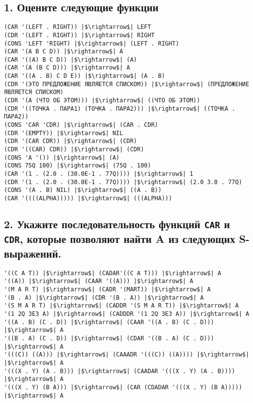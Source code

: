 \documentclass{amsart}
\begin{document}
\subsection{1. Оцените следующие функции}

\begin{verbatim}
(CAR '(LEFT . RIGHT)) |$\rightarrow$| LEFT
(CDR '(LEFT . RIGHT)) |$\rightarrow$| RIGHT
(CONS 'LEFT 'RIGHT) |$\rightarrow$| (LEFT . RIGHT)
(CAR '(A B C D)) |$\rightarrow$| A
(CAR '((A) B C D)) |$\rightarrow$| (A)
(CAR '(A (B C D))) |$\rightarrow$| A
(CAR '((A . B) C D E)) |$\rightarrow$| (A . B)
(CDR '(ЭТО ПРЕДЛОЖЕНИЕ ЯВЛЯЕТСЯ СПИСКОМ)) |$\rightarrow$| (ПРЕДЛОЖЕНИЕ ЯВЛЯЕТСЯ СПИСКОМ)
(CDR '(А (ЧТО ОБ ЭТОМ))) |$\rightarrow$| ((ЧТО ОБ ЭТОМ))
(CDR '((ТОЧКА . ПАРА1) (ТОЧКА . ПАРА2))) |$\rightarrow$| ((ТОЧКА . ПАРА2))
(CONS 'CAR 'CDR) |$\rightarrow$| (CAR . CDR)
(CDR '(EMPTY)) |$\rightarrow$| NIL
(CDR '(CAR CDR)) |$\rightarrow$| (CDR)
(CDR '((CAR) CDR)) |$\rightarrow$| (CDR)
(CONS 'A '()) |$\rightarrow$| (A)
(CONS 75Q 100) |$\rightarrow$| (75Q . 100)
(CAR '(1 . (2.0 . (30.0E-1 . 77Q)))) |$\rightarrow$| 1
(CDR '(1 . (2.0 . (30.0E-1 . 77Q)))) |$\rightarrow$| (2.0 3.0 . 77Q)
(CONS '(A . B) NIL) |$\rightarrow$| ((A . B))
(CAR '((((ALPHA))))) |$\rightarrow$| (((ALPHA)))
\end{verbatim}

\subsection{2. Укажите последовательность функций \texttt{CAR} и \texttt{CDR}, которые позволяют найти A из следующих S-выражений.}

\begin{verbatim}
'((C A T)) |$\rightarrow$| (CADAR'((C A T))) |$\rightarrow$| A
'((A)) |$\rightarrow$| (CAAR '((A))) |$\rightarrow$| A
'(M A R T) |$\rightarrow$| (CADR '(MART)) |$\rightarrow$| A
'(B . A) |$\rightarrow$| (CDR '(B . A)) |$\rightarrow$| A
'(S M A R T) |$\rightarrow$| (CADDR '(S M A R T)) |$\rightarrow$| A
'(1 2Q 3E3 A) |$\rightarrow$| (CADDDR '(1 2Q 3E3 A)) |$\rightarrow$| A
'((A . B) (C . D)) |$\rightarrow$| (CAAR '((A . B) (C . D))) |$\rightarrow$| A
'((B . A) (C . D)) |$\rightarrow$| (CDAR '((B . A) (C . D))) |$\rightarrow$| A
'(((C)) ((A))) |$\rightarrow$| (CAAADR '(((C)) ((A)))) |$\rightarrow$| |$\rightarrow$| A
'(((X . Y) (A . B))) |$\rightarrow$| (CAADAR '(((X . Y) (A . B)))) |$\rightarrow$| A
'(((X . Y) (B A))) |$\rightarrow$| (CAR (CDADAR '(((X . Y) (B A))))) |$\rightarrow$| A
\end{verbatim}
\end{document}
